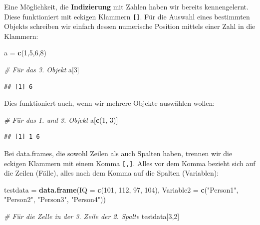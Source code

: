 \documentclass[
]{book}
\newenvironment{Shaded}{\begin{snugshade}}{\end{snugshade}}
\newcommand{\AttributeTok}[1]{\textcolor[rgb]{0.13,0.29,0.53}{#1}}
\newcommand{\CommentTok}[1]{\textcolor[rgb]{0.56,0.35,0.01}{\textit{#1}}}
\newcommand{\DecValTok}[1]{\textcolor[rgb]{0.00,0.00,0.81}{#1}}
\newcommand{\FunctionTok}[1]{\textcolor[rgb]{0.13,0.29,0.53}{\textbf{#1}}}
\newcommand{\NormalTok}[1]{#1}
\newcommand{\OtherTok}[1]{\textcolor[rgb]{0.56,0.35,0.01}{#1}}
\newcommand{\StringTok}[1]{\textcolor[rgb]{0.31,0.60,0.02}{#1}}
\begin{document}
Eine Möglichkeit, die \textbf{Indizierung} mit Zahlen haben wir bereits kennengelernt. Diese funktioniert mit eckigen Klammern \texttt{{[}{]}}. Für die Auswahl eines bestimmten Objekts schreiben wir einfach dessen numerische Position mittels einer Zahl in die Klammern:

\begin{Shaded}
\begin{Highlighting}[]
\NormalTok{a }\OtherTok{=} \FunctionTok{c}\NormalTok{(}\DecValTok{1}\NormalTok{,}\DecValTok{5}\NormalTok{,}\DecValTok{6}\NormalTok{,}\DecValTok{8}\NormalTok{)}

\CommentTok{\# Für das 3. Objekt}
\NormalTok{a[}\DecValTok{3}\NormalTok{]}
\end{Highlighting}
\end{Shaded}

\begin{verbatim}
## [1] 6
\end{verbatim}

Dies funktioniert auch, wenn wir mehrere Objekte auswählen wollen:

\begin{Shaded}
\begin{Highlighting}[]
\CommentTok{\# Für das 1. und 3. Objekt}
\NormalTok{a[}\FunctionTok{c}\NormalTok{(}\DecValTok{1}\NormalTok{, }\DecValTok{3}\NormalTok{)]}
\end{Highlighting}
\end{Shaded}

\begin{verbatim}
## [1] 1 6
\end{verbatim}

Bei data.frames, die sowohl Zeilen als auch Spalten haben, trennen wir die eckigen Klammern mit einem Komma \texttt{{[},{]}}. Alles vor dem Komma bezieht sich auf die Zeilen (Fälle), alles nach dem Komma auf die Spalten (Variablen):

\begin{Shaded}
\begin{Highlighting}[]
\NormalTok{testdata }\OtherTok{=} \FunctionTok{data.frame}\NormalTok{(}\AttributeTok{IQ =} \FunctionTok{c}\NormalTok{(}\DecValTok{101}\NormalTok{, }\DecValTok{112}\NormalTok{, }\DecValTok{97}\NormalTok{, }\DecValTok{104}\NormalTok{),}
                     \AttributeTok{Variable2 =} \FunctionTok{c}\NormalTok{(}\StringTok{"Person1"}\NormalTok{, }\StringTok{"Person2"}\NormalTok{, }\StringTok{"Person3"}\NormalTok{, }\StringTok{"Person4"}\NormalTok{))}

\CommentTok{\# Für die Zelle in der 3. Zeile der 2. Spalte}
\NormalTok{testdata[}\DecValTok{3}\NormalTok{,}\DecValTok{2}\NormalTok{]}
\end{Highlighting}
\end{Shaded}
\end{document}
